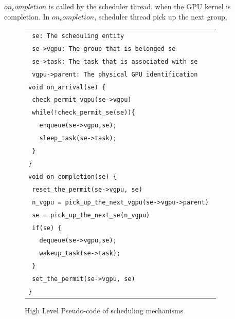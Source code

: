 $on_completion$ is called by the scheduler thread, when the GPU kernel is completion.
In $on_completion$, scheduler thread pick up the next group, 
\begin{figure}[t]
\begin{center}
\begin{tabular}{l}
\hline
{\scriptsize \verb| se: The scheduling entity |}\\
{\scriptsize \verb| se->vgpu: The group that is belonged se|}\\
{\scriptsize \verb| se->task: The task that is associated with se |}\\
{\scriptsize \verb| vgpu->parent: The physical GPU identification|}\\
\hline
{\scriptsize \verb|void on_arrival(se) {|}\\
{\scriptsize \verb| check_permit_vgpu(se->vgpu)    |}\\
{\scriptsize \verb| while(!check_permit_se(se)){|}\\
{\scriptsize \verb|   enqueue(se->vgpu,se); |}\\
{\scriptsize \verb|   sleep_task(se->task); |}\\
{\scriptsize \verb| }|}\\
{\scriptsize \verb|}|}\\
{\scriptsize \verb|void on_completion(se) {|}\\
{\scriptsize \verb| reset_the_permit(se->vgpu, se)|}\\
{\scriptsize \verb| n_vgpu = pick_up_the_next_vgpu(se->vgpu->parent) |}\\
{\scriptsize \verb| se = pick_up_the_next_se(n_vgpu)|}\\
{\scriptsize \verb| if(se) {|}\\
{\scriptsize \verb|   dequeue(se->vgpu,se);|}\\
{\scriptsize \verb|   wakeup_task(se->task);|}\\
{\scriptsize \verb| }|}\\
{\scriptsize \verb| set_the_permit(se->vgpu, se)|}\\
{\scriptsize \verb|}|}\\
\hline
\end{tabular}
\caption{High Level Pseudo-code of scheduling mechanisms}
\label{fig:scheduling}
\end{center}
\end{figure}

